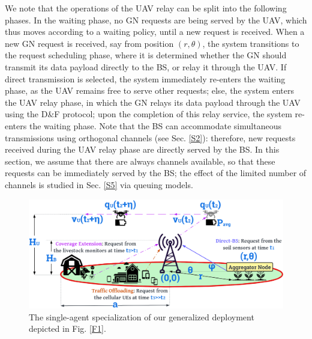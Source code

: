 \documentclass[12pt, draftcls, onecolumn]{IEEEtran}
\theoremstyle{plain}
\theoremstyle{definition}
\theoremstyle{remark}
\begin{document}
We note that the operations of the UAV relay can be split into the following phases. In the waiting phase, no GN requests are being served by the UAV, which thus moves according to a {waiting policy}, until a new request is received. When a new GN request is received, say from position $(r,\theta)$, the system transitions to the request scheduling phase, where it is determined whether the GN should transmit its data payload directly to the BS, or relay it through the UAV. If direct transmission is selected, the system immediately re-enters the waiting phase, as the UAV remains free to serve other requests; else, the system enters the UAV relay phase, in which the GN relays its data payload through the UAV using the D\&F protocol; upon the completion of this relay service, the system re-enters the waiting phase. Note that the BS can accommodate simultaneous transmissions using orthogonal channels (see Sec. \ref{S2}): therefore, new requests received during the UAV relay phase are directly served by the BS.  In this section, we assume that there are always channels available, so that these requests can be immediately served by the BS; the effect of the limited number of channels is studied in Sec. \ref{S5} via queuing models.

\begin{figure} [t]
    \centering
    \includegraphics[width=0.7\linewidth]{figs/Single_Agent_Specialization.png}
    \vspace{-2mm}
    \caption{The single-agent specialization of our generalized deployment depicted in Fig. \ref{F1}.}
    \label{F4}
\end{figure}
\end{document}
